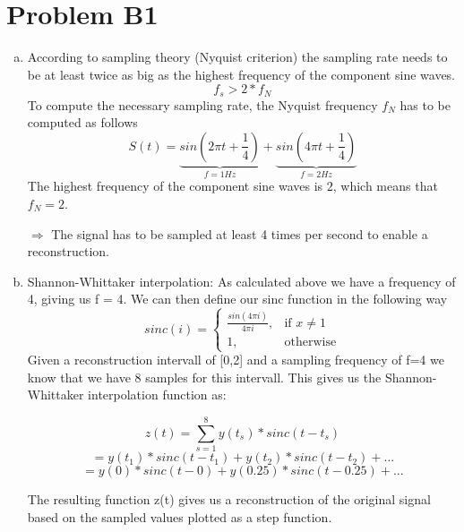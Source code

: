 \documentclass[12pt]{article}
\begin{document}
\lstset{language=C++}


\section*{Problem B1}
\begin{enumerate}[a)]
	\item According to sampling theory (Nyquist criterion) the sampling rate needs to be at least twice as big as the highest frequency of the component sine waves.
	$$ f_s > 2 * f_N$$
	To compute the necessary sampling rate, the Nyquist frequency $f_N$ has to be computed as follows
	$$ S(t) = \underbrace{sin(2\pi t + \frac{1}{4})}_{f = 1Hz} + \underbrace{sin(4\pi t + \frac{1}{4})}_{f = 2Hz}$$
	The highest frequency of the component sine waves is $2$, which means that $f_N = 2$.
	
	$\Rightarrow$ The signal has to be sampled at least 4 times per second to enable a reconstruction.
	
	\item Shannon-Whittaker interpolation:
	As calculated above we have a frequency of 4, giving us f = 4.
	We can then define our sinc function in the following way
	\[
    		sinc(i)= 
		\begin{cases}
    			 \frac{sin(4{\pi}i)}{4{\pi}i},& \text{if } x\neq 1\\
    			1,              & \text{otherwise}
		\end{cases}
	\]
	Given a reconstruction intervall of [0,2] and a sampling frequency of f=4 we know that we have 8 samples for this intervall. This gives us the Shannon-Whittaker interpolation function as:

	$$z(t) = \sum_{s=1}^{8} y(t_s) * sinc(t-t_s)$$
	$$=  y(t_1) * sinc(t-t_1) + y(t_2) * sinc(t-t_2) + ...$$
	$$=  y(0) * sinc(t-0) + y(0.25) * sinc(t-0.25) + ...$$
	
The resulting function {z(t)} gives us a reconstruction of the original signal based on the sampled values plotted as a step function.\\



\end{enumerate}
\end{document}
